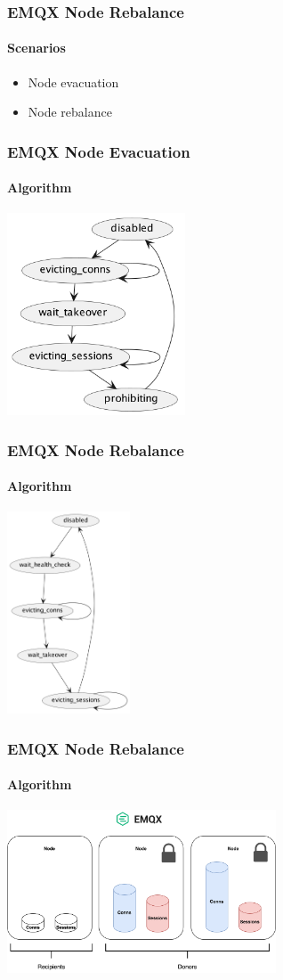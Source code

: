 \documentclass{beamer}
\begin{document}
\begin{frame}
    \frametitle{EMQX Node Rebalance}
    \framesubtitle{Scenarios}
    \begin{itemize}
        \item Node evacuation
        \item Node rebalance
    \end{itemize}
\end{frame}

\begin{frame}
    \frametitle{EMQX Node Evacuation}
    \framesubtitle{Algorithm}
    \begin{center}
        \includegraphics[height=6cm, keepaspectratio]{images/evacuation.png}
    \end{center}
\end{frame}

\begin{frame}
    \frametitle{EMQX Node Rebalance}
    \framesubtitle{Algorithm}
    \begin{center}
        \includegraphics[height=6cm, keepaspectratio]{images/rebalance.png}
    \end{center}
\end{frame}

\begin{frame}
    \frametitle{EMQX Node Rebalance}
    \framesubtitle{Algorithm}
    \begin{center}
        \includegraphics[width=8cm, keepaspectratio]{images/node-rebalance-algo0.png}
    \end{center}
\end{frame}
\end{document}
